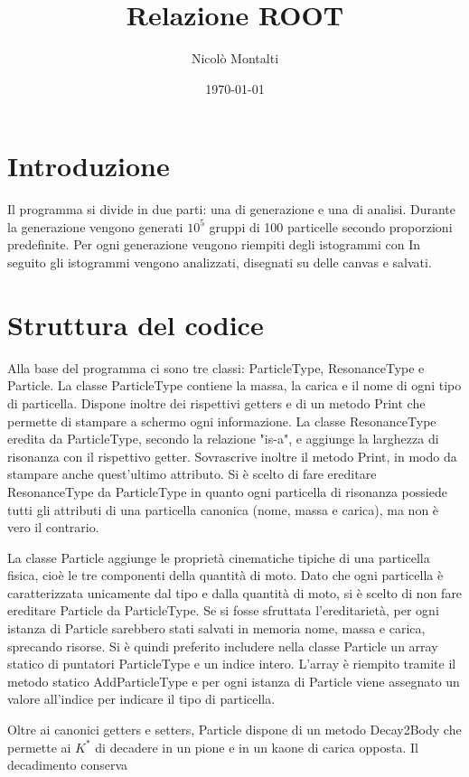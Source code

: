 \documentclass[a4paper,10pt,twocolumn]{article}
\title{Relazione ROOT}
\author{Nicolò Montalti}
\date{\today}
\begin{document}
\maketitle
\section{Introduzione}
Il programma si divide in due parti: una di generazione e una di analisi. Durante la generazione vengono generati $10^5$ gruppi di 100 particelle secondo proporzioni predefinite. Per ogni generazione vengono riempiti degli istogrammi con
In seguito gli istogrammi vengono analizzati, disegnati su delle canvas e salvati.

\section{Struttura del codice}
Alla base del programma ci sono tre classi: ParticleType, ResonanceType e Particle. La classe ParticleType contiene la massa, la carica e il nome di ogni tipo di particella. Dispone inoltre dei rispettivi getters e di un metodo Print che permette di stampare a schermo ogni informazione. La classe ResonanceType eredita da ParticleType, secondo la relazione "is-a", e aggiunge la larghezza di risonanza con il rispettivo getter. Sovrascrive inoltre il metodo Print, in modo da stampare anche quest'ultimo attributo. Si è scelto di fare ereditare ResonanceType da ParticleType in quanto ogni particella di risonanza possiede tutti gli attributi di una particella canonica (nome, massa e carica), ma non è vero il contrario.

La classe Particle aggiunge le proprietà cinematiche tipiche di una particella fisica, cioè le tre componenti della quantità di moto. Dato che ogni particella è caratterizzata unicamente dal tipo e dalla quantità di moto, si è scelto di non fare ereditare Particle da ParticleType. Se si fosse sfruttata l'ereditarietà, per ogni istanza di Particle sarebbero stati salvati in memoria nome, massa e carica, sprecando risorse. Si è quindi preferito includere nella classe Particle un array statico di puntatori ParticleType e un indice intero. L'array è riempito tramite il metodo statico AddParticleType e per ogni istanza di Particle viene assegnato un valore all'indice per indicare il tipo di particella.

Oltre ai canonici getters e setters, Particle dispone di un metodo Decay2Body che permette ai $K^*$ di decadere in un pione e in un kaone di carica opposta. Il decadimento conserva
\end{document}
